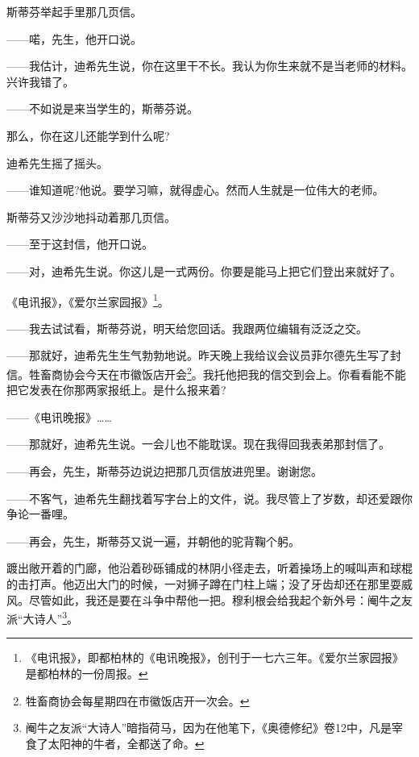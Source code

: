 \par 斯蒂芬举起手里那几页信。
\par ——喏，先生，他开口说。
\par ——我估计，迪希先生说，你在这里干不长。我认为你生来就不是当老师的材料。兴许我错了。
\par ——不如说是来当学生的，斯蒂芬说。
\par 那么，你在这儿还能学到什么呢?
\par 迪希先生摇了摇头。
\par ——谁知道呢?他说。要学习嘛，就得虚心。然而人生就是一位伟大的老师。
\par 斯蒂芬又沙沙地抖动着那几页信。
\par ——至于这封信，他开口说。
\par ——对，迪希先生说。你这儿是一式两份。你要是能马上把它们登出来就好了。
\par 《电讯报》，《爱尔兰家园报》\footnote{《电讯报》，即都柏林的《电讯晚报》，创刊于一七六三年。《爱尔兰家园报》是都柏林的一份周报。}。
\par ——我去试试看，斯蒂芬说，明天给您回话。我跟两位编辑有泛泛之交。
\par ——那就好，迪希先生生气勃勃地说。昨天晚上我给议会议员菲尔德先生写了封信。牲畜商协会今天在市徽饭店开会\footnote{牲畜商协会每星期四在市徽饭店开一次会。}。我托他把我的信交到会上。你看看能不能把它发表在你那两家报纸上。是什么报来着?
\par ——《电讯晚报》……
\par ——那就好，迪希先生说。一会儿也不能耽误。现在我得回我表弟那封信了。
\par ——再会，先生，斯蒂芬边说边把那几页信放进兜里。谢谢您。
\par ——不客气，迪希先生翻找着写字台上的文件，说。我尽管上了岁数，却还爱跟你争论一番哩。
\par ——再会，先生，斯蒂芬又说一遍，并朝他的驼背鞠个躬。
\par 踱出敞开着的门廊，他沿着砂砾铺成的林阴小径走去，听着操场上的喊叫声和球棍的击打声。他迈出大门的时候，一对狮子蹲在门柱上端；没了牙齿却还在那里耍威风。尽管如此，我还是要在斗争中帮他一把。穆利根会给我起个新外号：阉牛之友派“大诗人”\footnote{阉牛之友派“大诗人”暗指荷马，因为在他笔下，《奥德修纪》卷12中，凡是宰食了太阳神的牛者，全都送了命。}。
